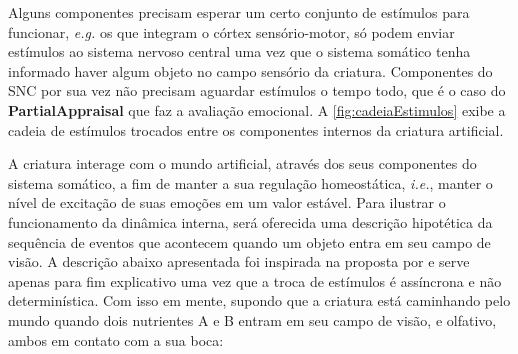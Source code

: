 Alguns componentes precisam esperar um certo conjunto de estímulos para funcionar, \textit{e.g.} os que integram o córtex sensório-motor, só podem enviar estímulos ao sistema nervoso central uma vez que o sistema somático tenha informado haver algum objeto no campo sensório da criatura. Componentes do SNC por sua vez não precisam aguardar estímulos o tempo todo, que é o caso do \textbf{PartialAppraisal} que faz a avaliação emocional.  A \autoref{fig:cadeiaEstimulos} exibe a cadeia de estímulos trocados entre os componentes internos da criatura artificial. 

A criatura interage com o mundo artificial, através dos seus componentes do sistema somático, a fim de manter a sua regulação homeostática, \textit{i.e.}, manter o nível de excitação de suas emoções em um  valor estável. Para ilustrar o funcionamento da dinâmica interna, será oferecida uma descrição hipotética da sequência de eventos que acontecem quando um objeto entra em seu campo de visão. A descrição abaixo apresentada foi inspirada na proposta por  e serve apenas para fim explicativo uma vez que a troca de estímulos é assíncrona e não determinística. Com isso em mente, supondo que a criatura está caminhando pelo mundo quando dois nutrientes A e B entram em seu campo de visão, e olfativo, ambos em contato com a sua boca: 

